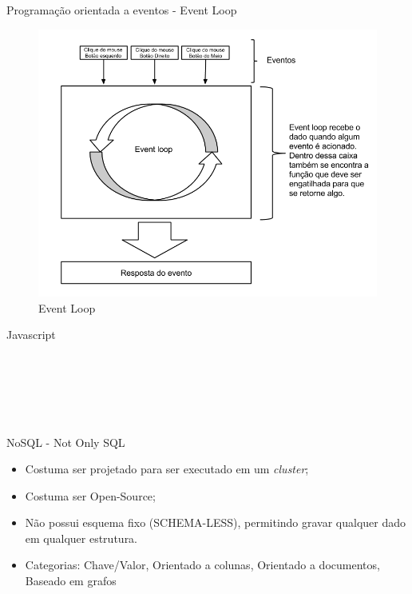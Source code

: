\documentclass{beamer}
\newlength{\wideitemsep}
\let\olditem\item
\renewcommand{\item}{\setlength{\itemsep}{\wideitemsep}\olditem}
\begin{document}
\begin{frame}{Programação orientada a eventos - Event Loop}
    \begin{figure}[htb]
    \centering
    \includegraphics[scale=0.30]{../images/event_loop_diagram.png}
    \caption{Event Loop}
    \label{fig: graf_eld}
    \end{figure}
\end{frame}

\begin{frame}{Javascript}
    \begin{description}
        \item[Tipagem dinâmica] \hfill \\
        \item[Baseada em protótipos] \hfill \\
        \item[Linguagem orientada a eventos] \hfill \\
    \end{description}
\end{frame}

\begin{frame}{NoSQL - Not Only SQL}
    \begin{itemize}
        \item Costuma ser projetado para ser executado em um \textit{cluster};
        \item Costuma ser Open-Source; 
        \item Não possui esquema fixo (SCHEMA-LESS), permitindo gravar qualquer dado em qualquer estrutura.
        \item Categorias: Chave/Valor, Orientado a colunas, Orientado a documentos, Baseado em grafos
    \end{itemize}
\end{frame}
\end{document}
